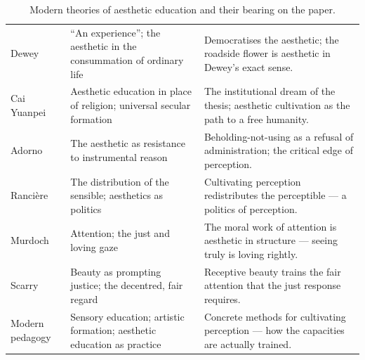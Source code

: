 \begin{table}[ht]
\centering
\small
\begin{tabularx}{\linewidth}{L{2.7cm} L{3.5cm} Z}
 &  &  \\
\midrule
Dewey \parencite{dewey1934} & ``An experience''; the aesthetic in the consummation of ordinary life & Democratises the aesthetic; the roadside flower is aesthetic in Dewey's exact sense. \\
Cai Yuanpei \parencite{caiyuanpei2015} & Aesthetic education in place of religion; universal secular formation & The institutional dream of the thesis; aesthetic cultivation as the path to a free humanity. \\
Adorno \parencite{adorno1997} & The aesthetic as resistance to instrumental reason & Beholding-not-using as a refusal of administration; the critical edge of perception. \\
Rancière \parencite{ranciere2004} & The distribution of the sensible; aesthetics as politics & Cultivating perception redistributes the perceptible --- a politics of perception. \\
Murdoch \parencite{murdoch1970} & Attention; the just and loving gaze & The moral work of attention is aesthetic in structure --- seeing truly is loving rightly. \\
Scarry \parencite{scarry1999} & Beauty as prompting justice; the decentred, fair regard & Receptive beauty trains the fair attention that the just response requires. \\
Modern pedagogy \parencite{montessori1967,steiner1996,greene2001,eisner2002} & Sensory education; artistic formation; aesthetic education as practice & Concrete methods for cultivating perception --- how the capacities are actually trained. \\
\end{tabularx}
\caption{Modern theories of aesthetic education and their bearing on the paper.}
\label{p21:tab:ae-modern}
\end{table}

